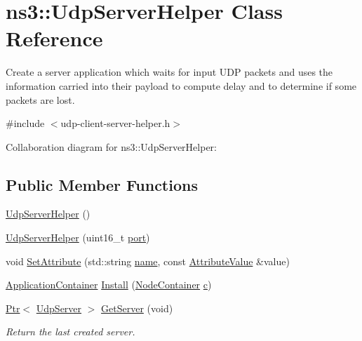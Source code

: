 \hypertarget{classns3_1_1UdpServerHelper}{}\section{ns3\+:\+:Udp\+Server\+Helper Class Reference}
\label{classns3_1_1UdpServerHelper}


Create a server application which waits for input U\+DP packets and uses the information carried into their payload to compute delay and to determine if some packets are lost.  




{\ttfamily \#include $<$udp-\/client-\/server-\/helper.\+h$>$}



Collaboration diagram for ns3\+:\+:Udp\+Server\+Helper\+:
\subsection*{Public Member Functions}
\begin{DoxyCompactItemize}
\item 
\hyperlink{classns3_1_1UdpServerHelper_aa6f2a10cd60a85222bfc45877a55723f}{Udp\+Server\+Helper} ()
\item 
\hyperlink{classns3_1_1UdpServerHelper_aaca1535faca2b749f026c5ca6b5025a4}{Udp\+Server\+Helper} (uint16\+\_\+t \hyperlink{visualizer-ideas_8txt_a21ff1c530daf8435e00048b7fc2c58e3}{port})
\item 
void \hyperlink{classns3_1_1UdpServerHelper_a163167af4a06caebbdc26ede754f3b83}{Set\+Attribute} (std\+::string \hyperlink{generate__test__data__lte__spectrum__model_8m_ab74e6bf80237ddc4109968cedc58c151}{name}, const \hyperlink{classns3_1_1AttributeValue}{Attribute\+Value} \&value)
\item 
\hyperlink{classns3_1_1ApplicationContainer}{Application\+Container} \hyperlink{classns3_1_1UdpServerHelper_a7a92fc7bb7f29540ede727090de225b1}{Install} (\hyperlink{classns3_1_1NodeContainer}{Node\+Container} \hyperlink{mmwave_2model_2fading-traces_2fading__trace__generator_8m_ae0323a9039add2978bf5b49550572c7c}{c})
\item 
\hyperlink{classns3_1_1Ptr}{Ptr}$<$ \hyperlink{classns3_1_1UdpServer}{Udp\+Server} $>$ \hyperlink{classns3_1_1UdpServerHelper_a32e933394ee7850d153c14433958f73f}{Get\+Server} (void)
\begin{DoxyCompactList}\small\item\em Return the last created server. \end{DoxyCompactList}\end{DoxyCompactItemize}
